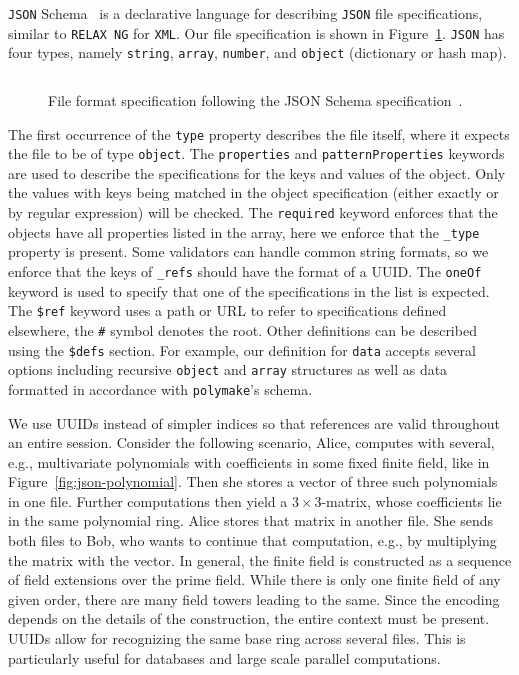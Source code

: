\documentclass[runningheads]{llncs}
\newcommand\polymake{\texttt{polymake}\xspace}
\newcommand\JSON{\texttt{JSON}\xspace}
\newcommand\RNG{\texttt{RELAX NG}\xspace}
\newcommand\XML{\texttt{XML}\xspace}
\begin{document}
\JSON Schema~\cite{json-schema-2020-12} is a declarative language for describing \JSON file specifications, similar to \RNG for \XML.
Our file specification is shown in Figure~\ref{fig:file-schema}. 
\JSON has four types, namely \texttt{string}, \texttt{array}, \texttt{number}, and \texttt{object} (dictionary or hash map).
\begin{figure}[t]
  \inputminted[frame=single, framesep=3mm, linenos=false, fontsize=\footnotesize]{js}{data.json}
  \caption{%
    File format specification following the JSON Schema specification~\cite{json-schema-2020-12}.
    \label{fig:file-schema}
  }
\end{figure}
The first occurrence of the \texttt{type} property describes the file itself, where it expects the file to be of type \texttt{object}.
The \texttt{properties} and \texttt{patternProperties} keywords are used to describe the specifications for the keys and values of the object.
Only the values with keys being matched in the object specification (either exactly or by regular expression) will be checked.
The \texttt{required} keyword enforces that the objects have all properties listed in the array, here we enforce that the \texttt{\_type} property is present.
Some validators can handle common string formats, so we enforce that the keys of \texttt{\_refs} should have the format of a UUID.
The \texttt{oneOf} keyword is used to specify that one of the specifications in the list is expected.
The \texttt{\$ref} keyword uses a path or URL to refer to specifications defined elsewhere, the \texttt{\#} symbol denotes the root.
Other definitions can be described using the \texttt{\$defs} section. For example, our definition for \texttt{data} accepts several options
including recursive \texttt{object} and \texttt{array} structures as well as data formatted in accordance with \polymake's schema.

We use UUIDs instead of simpler indices so that references are valid throughout an entire session.
Consider the following scenario, Alice, computes with several, e.g., multivariate polynomials with coefficients in some fixed finite field, like in Figure~\ref{fig:json-polynomial}.
Then she stores a vector of three such polynomials in one file.
Further computations then yield a $3{\times}3$-matrix, whose coefficients lie in the same polynomial ring.
Alice stores that matrix in another file.
She sends both files to Bob, who wants to continue that computation, e.g., by multiplying the matrix with the vector.
In general, the finite field is constructed as a sequence of field extensions over the prime field.
While there is only one finite field of any given order, there are many field towers leading to the same.
Since the encoding depends on the details of the construction, the entire context must be present.
UUIDs allow for recognizing the same base ring across several files.
This is particularly useful for databases and large scale parallel computations.
\end{document}
